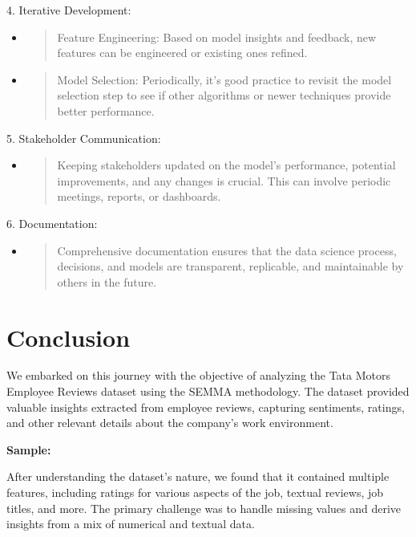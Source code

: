 \documentclass[
]{article}
\begin{document}
4. Iterative Development:

\begin{itemize}
\item
  \begin{quote}
  Feature Engineering: Based on model insights and feedback, new
  features can be engineered or existing ones refined.
  \end{quote}
\item
  \begin{quote}
  Model Selection: Periodically, it's good practice to revisit the model
  selection step to see if other algorithms or newer techniques provide
  better performance.
  \end{quote}
\end{itemize}

5. Stakeholder Communication:

\begin{itemize}
\item
  \begin{quote}
  Keeping stakeholders updated on the model's performance, potential
  improvements, and any changes is crucial. This can involve periodic
  meetings, reports, or dashboards.
  \end{quote}
\end{itemize}

6. Documentation:

\begin{itemize}
\item
  \begin{quote}
  Comprehensive documentation ensures that the data science process,
  decisions, and models are transparent, replicable, and maintainable by
  others in the future.
  \end{quote}
\end{itemize}

\hypertarget{conclusion}{%
\section{Conclusion}\label{conclusion}}

We embarked on this journey with the objective of analyzing the Tata
Motors Employee Reviews dataset using the SEMMA methodology. The dataset
provided valuable insights extracted from employee reviews, capturing
sentiments, ratings, and other relevant details about the company's work
environment.

\textbf{Sample:}

After understanding the dataset's nature, we found that it contained
multiple features, including ratings for various aspects of the job,
textual reviews, job titles, and more. The primary challenge was to
handle missing values and derive insights from a mix of numerical and
textual data.
\end{document}
